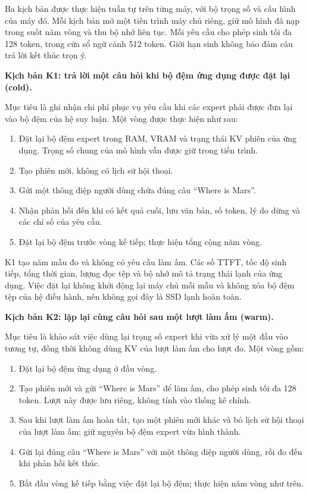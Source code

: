 Ba kịch bản được thực hiện tuần tự trên từng máy, với bộ trọng số và cấu hình của máy đó. Mỗi kịch bản mở một tiến trình máy chủ riêng, giữ mô hình đã nạp trong suốt năm vòng và thu bộ nhớ liên tục. Mỗi yêu cầu cho phép sinh tối đa 128 token, trong cửa sổ ngữ cảnh 512 token. Giới hạn sinh không bảo đảm câu trả lời kết thúc trọn ý.

\textbf{Kịch bản K1: trả lời một câu hỏi khi bộ đệm ứng dụng được đặt lại (cold).}

Mục tiêu là ghi nhận chi phí phục vụ yêu cầu khi các expert phải được đưa lại vào bộ đệm của hệ suy luận. Một vòng được thực hiện như sau:

\begin{enumerate}
\item Đặt lại bộ đệm expert trong RAM, VRAM và trạng thái KV phiên của ứng dụng. Trọng số chung của mô hình vẫn được giữ trong tiến trình.
\item Tạo phiên mới, không có lịch sử hội thoại.
\item Gửi một thông điệp người dùng chứa đúng câu “Where is Mars”.
\item Nhận phản hồi đến khi có kết quả cuối, lưu văn bản, số token, lý do dừng và các chỉ số của yêu cầu.
\item Đặt lại bộ đệm trước vòng kế tiếp; thực hiện tổng cộng năm vòng.
\end{enumerate}

K1 tạo năm mẫu đo và không có yêu cầu làm ấm. Các số TTFT, tốc độ sinh tiếp, tổng thời gian, lượng đọc tệp và bộ nhớ mô tả trạng thái lạnh của ứng dụng. Việc đặt lại không khởi động lại máy chủ mỗi mẫu và không xóa bộ đệm tệp của hệ điều hành, nên không gọi đây là SSD lạnh hoàn toàn.

\textbf{Kịch bản K2: lặp lại cùng câu hỏi sau một lượt làm ấm (warm).}

Mục tiêu là khảo sát việc dùng lại trọng số expert khi vừa xử lý một đầu vào tương tự, đồng thời không dùng KV của lượt làm ấm cho lượt đo. Một vòng gồm:

\begin{enumerate}
\item Đặt lại bộ đệm ứng dụng ở đầu vòng.
\item Tạo phiên mới và gửi “Where is Mars” để làm ấm, cho phép sinh tối đa 128 token. Lượt này được lưu riêng, không tính vào thống kê chính.
\item Sau khi lượt làm ấm hoàn tất, tạo một phiên mới khác và bỏ lịch sử hội thoại của lượt làm ấm; giữ nguyên bộ đệm expert vừa hình thành.
\item Gửi lại đúng câu “Where is Mars” với một thông điệp người dùng, rồi đo đến khi phản hồi kết thúc.
\item Bắt đầu vòng kế tiếp bằng việc đặt lại bộ đệm; thực hiện năm vòng như trên.
\end{enumerate}

